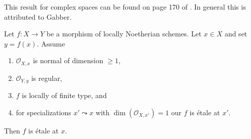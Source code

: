 \begin{lemma}
\label{lemma-purity-ramification}
\begin{reference}
This result for complex spaces can be found on page 170 of \cite{Fischer}.
In general this is \cite[Theorem 2.4]{Zong} attributed to Gabber.
\end{reference}
Let $f : X \to Y$ be a morphism of locally Noetherian schemes.
Let $x \in X$ and set $y = f(x)$. Assume
\begin{enumerate}
\item $\mathcal{O}_{X, x}$ is normal of dimension $\geq 1$,
\item $\mathcal{O}_{Y, y}$ is regular,
\item $f$ is locally of finite type, and
\item for specializations $x' \leadsto x$ with
$\dim(\mathcal{O}_{X, x'}) = 1$ our $f$ is \'etale at $x'$.
\end{enumerate}
Then $f$ is \'etale at $x$.
\end{lemma}

